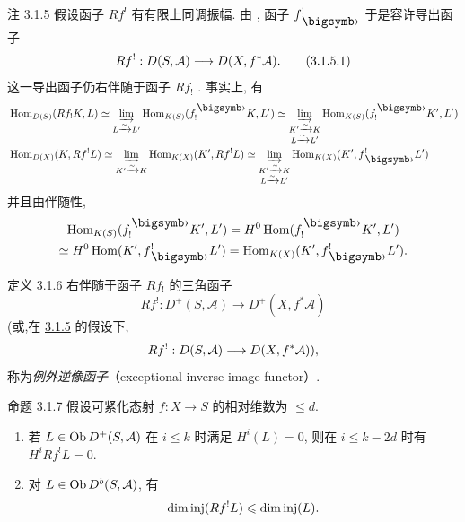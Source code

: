 \hypertarget{sga4.exp.XVIII.remark.3.1.5}{}\begin{enonce*}[remark]{注 3.1.5}
假设函子 $Rf^{!}$ 有有限上同调振幅. 由 , 函子 $f^{!}_{\bigdot}$ 于是容许导出函子
\begin{equation*}
Rf^{!}:D(S,\mathcal{A})\longrightarrow D(X,f^{\ast}\mathcal{A}){}.\tag{3.1.5.1}
\end{equation*}%
这一导出函子仍右伴随于函子 $Rf_{!}$ . 事实上, 有
\begin{align*}
& \Hom_{D(S)}(Rf_{!}K,L)\simeq
\varinjlim_{L\xrightarrow{\sim}L'}\Hom_{K(S)}(f^{\bigdot}_{!}K,L')\simeq
\varinjlim_{\substack{K'\xrightarrow{\sim}K\\ L\xrightarrow{\sim}
L'}}\Hom_{K(S)} (f^{\bigdot}_{!}K', L')\\
& \Hom_{D(X)}(K,Rf^{!}L)\simeq
\varinjlim_{K'\xrightarrow{\sim}K}\Hom_{K(X)}(K',Rf^{!}L)\simeq
\varinjlim_{\substack{K'\xrightarrow{\sim}K\\
L\xrightarrow{\sim}L'}}\Hom_{K(X)}(K', f^{!}_{\bigdot}L')
\end{align*}
并且由伴随性,
$$
\begin{gathered}
\Hom_{K(S)}(f^{\bigdot}_{!}K',L')=H^{0}\Hom(f^{\bigdot}_{!}K',L')\\
\simeq H^{0}\Hom(K',f^{!}_{\bigdot}L')=\Hom_{K(X)}(K',f^{!}_{\bigdot}L'){\quoi}.
\end{gathered}
$$
\end{enonce*}

\hypertarget{sga4.exp.XVIII.definition.3.1.6}{}\begin{enonce*}{定义 3.1.6}
右伴随于函子 $Rf_{!}$  的三角函子
$$
Rf^{!}:D^{+}(S,\mathcal{A})\longrightarrow
D^{+}(X,f^{\ast}\mathcal{A})
$$
(或,\pageoriginale 在 \hyperref[XVIII.rem3.1.5]{3.1.5} 的假设下,
$$
Rf^{!}:D(S,\mathcal{A})\longrightarrow
D(X,f^{\ast}\mathcal{A})){},
$$
称为\emph{例外逆像函子}（exceptional inverse-image functor）.
\end{enonce*}

\hypertarget{sga4.exp.XVIII.proposition.3.1.7}{}\begin{enonce*}{命题 3.1.7}
假设可紧化态射 $f:X\rightarrow S$ 的相对维数为 $\leq d$.
\begin{enumerate}
\renewcommand{\theenumi}{\roman{enumi}}
\renewcommand{\labelenumi}{(\theenumi)}
\item 若 $L\in \operatorname{Ob} D^{+}(S,\mathcal{A})$ 在 $i\leq k$ 时满足 $H^{i}(L)=0$, 则在 $i\leq k-2d$ 时有 $H^{i}Rf^{!}L=0$.

\item 对 $L\in \operatorname{Ob} D^{b}(S,\mathcal{A})$, 有
$$
\dim \operatorname{inj} (Rf^{!}L)\leqslant \dim \operatorname{inj} (L){}.
$$
\end{enumerate}
\end{enonce*}

